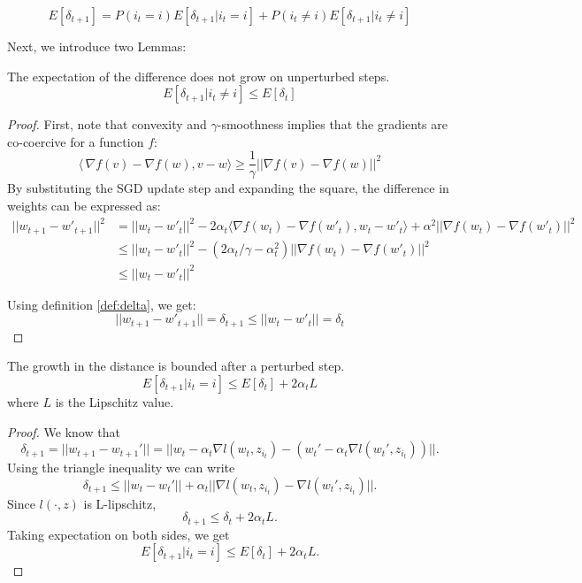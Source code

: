 \documentclass{article}
\begin{document}
\begin{equation} \label{eqn: sgd_prob_decomp}
    E[\delta_{t+1}] = P(i_t = i) E[\delta_{t+1} | i_t = i] + P(i_t \neq i) E[\delta_{t+1} | i_t \neq i]
\end{equation}

Next, we introduce two Lemmas:

\begin{lemma} \label{lem: lem_1}
The expectation of the difference does not grow on unperturbed steps.
    \[
    E[\delta_{t+1} | i_t \neq i] \leq E[\delta_t]
    \]
\end{lemma}
\begin{proof}
First, note that convexity and $\gamma$-smoothness implies that the gradients are co-coercive for a  function $f$: 
\[ 
\langle\,\nabla f(v)- \nabla f(w), v-w \rangle \geq \frac{1}{\gamma}||\nabla f(v)- \nabla f(w)||^2
\]
By substituting the SGD update step and expanding the square, the difference in weights can be expressed as:
\begin{align*}
    ||w_{t+1}-w'_{t+1}||^2 &= ||w_t-w'_t||^2 - 2\alpha_t \langle \nabla f(w_t)- \nabla f(w'_t), w_t-w'_t \rangle +\alpha^2 ||\nabla f(w_t)- \nabla f(w'_t)||^2\\
    &\leq ||w_t-w'_t||^2 - (2 \alpha_t / \gamma - \alpha_t^2) ||\nabla f(w_t)- \nabla f(w'_t)||^2\\
    &\leq ||w_t-w'_t||^2
\end{align*}


Using definition \ref{def:delta}, we get:
    \[
    ||w_{t+1}-w'_{t+1}|| = \delta_{t+1} \leq ||w_{t}-w'_{t}|| = \delta_{t}
    \]
\end{proof}
\begin{lemma} \label{lem: lem_2} The growth in the distance is bounded after a perturbed step.
    \[
    E[\delta_{t+1} | i_t = i] \leq E[\delta_t] + 2 \alpha_t L
    \]
where $L$ is the Lipschitz value.
\end{lemma}
\begin{proof}
We know that 
    \[\delta_{t+1}=||w_{t+1}-w_{t+1}'||=||w_t-\alpha_t \nabla l(w_t, z_{i_t}) - ( w_t'-\alpha_t \nabla l(w_t', z_{i_t}))||.
    \]
Using the triangle inequality we can write
    \[\delta_{t+1} \leq ||w_t - w_t'|| + \alpha_t||\nabla l(w_t,z_{i_t}) - \nabla l(w_t',z_{i_t})||.
    \]
Since $l(\cdot, z)$ is L-lipschitz,
    \[\delta_{t+1} \leq \delta_t + 2\alpha_t L.
    \]
Taking expectation on both sides, we get
    \[E[\delta_{t+1}|i_t=i] \leq E[\delta_t] + 2\alpha_t L.
    \]
\end{proof}
\end{document}
